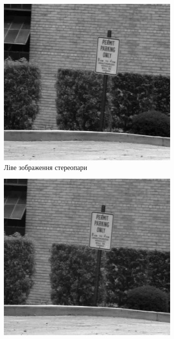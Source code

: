\begin{figure}[h]
  \centering
  \begin{subfigure}[b]{0.4\textwidth}
      \includegraphics[width=\textwidth]{images/overview_cox_dynamic_left}
      \caption{Ліве зображення стереопари}
  \end{subfigure}
  \qquad
  \begin{subfigure}[b]{0.4\textwidth}
      \includegraphics[width=\textwidth]{images/overview_cox_dynamic_right}

\end{subfigure}
\end{figure}

